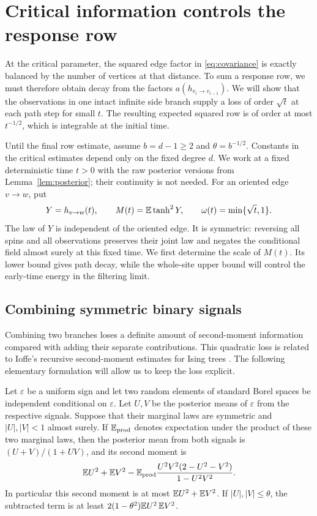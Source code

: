 \section{Critical information controls the response row}
\label{sec:critical-information}

At the critical parameter, the squared edge factor in
\eqref{eq:covariance} is exactly balanced by the number of vertices
at that distance.  To sum a response row, we must therefore obtain
decay from the factors \(a(h_{v_i\to v_{i-1}})\).  We will show that
the observations in one intact infinite side branch supply a loss of
order \(\sqrt t\) at each path step for small \(t\).  The resulting
expected squared row is of order at most \(t^{-1/2}\), which is
integrable at the initial time.

Until the final row estimate, assume
\(b=d-1\ge2\) and \(\theta=b^{-1/2}\).  Constants in the critical
estimates depend only on the fixed degree \(d\).  We work at a fixed
deterministic time \(t>0\) with the raw posterior versions from
Lemma~\ref{lem:posterior}; their continuity is not needed.  For an
oriented edge \(v\to w\), put
\[
 Y=h_{v\to w}(t),\qquad
 M(t)=\mathbb E\tanh^2Y,\qquad
 \omega(t)=\min\{\sqrt t,1\}.
\]
The law of \(Y\) is independent of the oriented edge.  It is symmetric:
reversing all spins and all observations preserves their joint law and
negates the conditional field almost surely at this fixed time.
We first determine the scale
of \(M(t)\).  Its lower bound gives path decay, while the whole-site
upper bound will control the early-time energy in the filtering limit.

\subsection{Combining symmetric binary signals}

Combining two branches loses a definite amount of second-moment
information compared with adding their separate contributions.  This
quadratic loss is related to Ioffe's recursive second-moment estimates
for Ising trees \cite[Proposition~4]{Ioffe1996GeneralTrees}.  The following elementary
formulation will allow us to keep the loss explicit.

\begin{lemma}
\label{lem:binary-fusion}
Let \(\varepsilon\) be a uniform sign and let two random elements of
standard Borel spaces be independent conditional on \(\varepsilon\).
Let \(U,V\) be the posterior means of
\(\varepsilon\) from the respective signals.  Suppose that their
marginal laws are symmetric and \(|U|,|V|<1\) almost surely.  If
\(\mathbb E_{\mathrm{prod}}\) denotes expectation under the product of these
two marginal laws, then the posterior mean from both signals is
\((U+V)/(1+UV)\), and its second moment is
\begin{equation}
\label{eq:binary-fusion}
 \mathbb E U^2+\mathbb E V^2-
 \mathbb E_{\mathrm{prod}}
   \frac{U^2V^2(2-U^2-V^2)}{1-U^2V^2}.
\end{equation}
In particular this second moment is at most \(\mathbb E U^2+\mathbb E V^2\).
If \(|U|,|V|\le\theta\), the subtracted term is at least
\(2(1-\theta^2)\mathbb E U^2\,\mathbb E V^2\).
\end{lemma}


